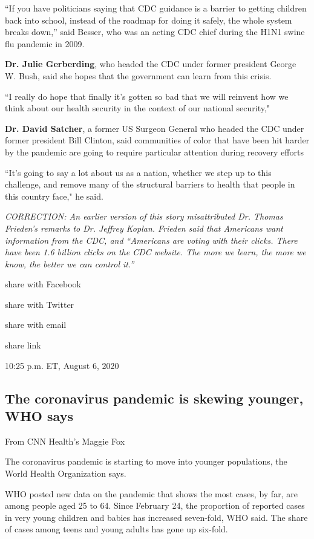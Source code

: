``If you have politicians saying that CDC guidance is a barrier to
getting children back into school, instead of the roadmap for doing it
safely, the whole system breaks down,'' said Besser, who was an acting
CDC chief during the H1N1 swine flu pandemic in 2009.

\textbf{Dr. Julie Gerberding}, who headed the CDC under former president
George W. Bush, said she hopes that the government can learn from this
crisis.

``I really do hope that finally it's gotten so bad that we will reinvent
how we think about our health security in the context of our national
security,"~

\textbf{Dr. David Satcher}, a former US Surgeon General who headed the
CDC under former president Bill Clinton, said communities of color that
have been hit harder by the pandemic are going to require particular
attention during recovery efforts

``It's going to say a lot about us as a nation, whether we step up to
this challenge, and remove many of the structural barriers to health
that people in this country face," he said.

\emph{CORRECTION: An earlier version of this story misattributed Dr.
Thomas Frieden's remarks to Dr. Jeffrey Koplan. Frieden said that
Americans want information from the CDC, and ``Americans are voting with
their clicks. There have been 1.6 billion clicks on the CDC website. The
more we learn, the more we know, the better we can control it.''}

share with Facebook

share with Twitter

share with email

share link

10:25 p.m. ET, August 6, 2020

\hypertarget{the-coronavirus-pandemic-is-skewing-younger-who-says}{%
\subsection{The coronavirus pandemic is skewing younger, WHO
says}\label{the-coronavirus-pandemic-is-skewing-younger-who-says}}

From CNN Health's Maggie Fox

The coronavirus pandemic is starting to move into younger populations,
the World Health Organization says.

WHO posted new data on the pandemic that shows the most cases, by far,
are among people aged 25 to 64. Since February 24, the proportion of
reported cases in very young children and babies has increased
seven-fold, WHO said. The share of cases among teens and young adults
has gone up six-fold.~

